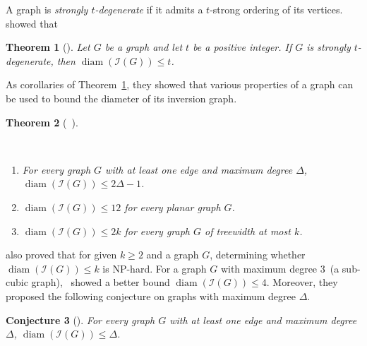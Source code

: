 \documentclass[
final
]{dmtcs-episciences}
\DeclareMathOperator{\diam}{\mathrm{diam}}
\newtheorem{theorem}{Theorem}[section]
\newtheorem{conjecture}[theorem]{Conjecture}
\begin{document}
A graph is \emph{strongly $t$-degenerate} if it admits a $t$-strong ordering of its vertices.
~\cite{havet2024diameter} showed that
\begin{theorem}[\cite{havet2024diameter}]\label{thm: strong t degenerate}
Let $G$ be a graph and let $t$ be a positive integer.
If $G$ is strongly $t$-degenerate, then $\diam(\mathcal{I}(G)) \le t$.
\end{theorem}

As corollaries of Theorem~\ref{thm: strong t degenerate}, they showed that various properties of a graph can be used to bound the diameter of its inversion graph.


\begin{theorem}[~\cite{havet2024diameter}]\label{thm: havet}

\par~
\begin{enumerate}
    \item For every graph $G$ with at least one edge and maximum degree $\Delta$, $\diam(\mathcal{I}(G)) \le 2\Delta - 1$.
    \item $\diam(\mathcal{I}(G)) \le 12$ for every planar graph $G$.
    \item
    $\diam(\mathcal{I}(G)) \le 2k$ for every graph $G$ of treewidth at most $k$.
\end{enumerate}
\end{theorem}

\cite{havet2024diameter} also proved that for given $k \ge 2$ and a graph $G$, determining whether $\diam(\mathcal{I}(G)) \le k$ is NP-hard.
For a graph $G$ with maximum degree $3$~(a sub-cubic graph),~\cite{havet2024diameter} showed a better bound $\diam(\mathcal{I}(G)) \le 4$. 
Moreover, they proposed the following conjecture on graphs with maximum degree $\Delta$.

\begin{conjecture}[\cite{havet2024diameter}]\label{conj: Delta}
For every graph $G$ with at least one edge and maximum degree $\Delta$, $\diam(\mathcal{I}(G)) \le \Delta$.
\end{conjecture}
\end{document}
